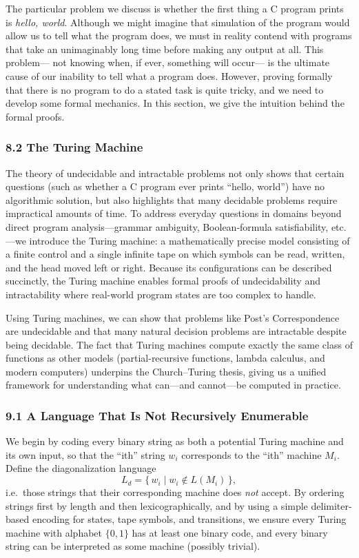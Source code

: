 \documentclass{article}
\begin{document}
The particular problem we discuss is whether the first thing a C program prints is \emph{hello, world}. Although we might imagine that simulation of the program would allow us to tell what the program does, we must in reality contend with programs that take an unimaginably long time before making any output at all. This problem— not knowing when, if ever, something will occur— is the ultimate cause of our inability to tell what a program does. However, proving formally that there is no program to do a stated task is quite tricky, and we need to develop some formal mechanics. In this section, we give the intuition behind the formal proofs.

\subsubsection*{8.2 The Turing Machine}
The theory of undecidable and intractable problems not only shows that certain questions (such as whether a C program ever prints “hello, world”) have no algorithmic solution, but also highlights that many decidable problems require impractical amounts of time. To address everyday questions in domains beyond direct program analysis—grammar ambiguity, Boolean-formula satisfiability, etc.—we introduce the Turing machine: a mathematically precise model consisting of a finite control and a single infinite tape on which symbols can be read, written, and the head moved left or right. Because its configurations can be described succinctly, the Turing machine enables formal proofs of undecidability and intractability where real-world program states are too complex to handle.

Using Turing machines, we can show that problems like Post’s Correspondence are undecidable and that many natural decision problems are intractable despite being decidable. The fact that Turing machines compute exactly the same class of functions as other models (partial-recursive functions, lambda calculus, and modern computers) underpins the Church–Turing thesis, giving us a unified framework for understanding what can—and cannot—be computed in practice.

\subsubsection*{9.1 A Language That Is Not Recursively Enumerable}
We begin by coding every binary string as both a potential Turing machine and its own input, so that the “ith” string \(w_i\) corresponds to the “ith” machine \(M_i\). Define the diagonalization language  
\[
L_d = \{\,w_i \mid w_i\notin L(M_i)\,\},
\]
i.e.\ those strings that their corresponding machine does \emph{not} accept. By ordering strings first by length and then lexicographically, and by using a simple delimiter-based encoding for states, tape symbols, and transitions, we ensure every Turing machine with alphabet \(\{0,1\}\) has at least one binary code, and every binary string can be interpreted as some machine (possibly trivial).
\end{document}
